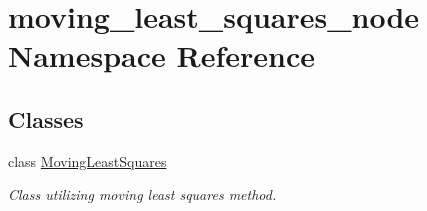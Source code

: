 \hypertarget{namespacemoving__least__squares__node}{}\section{moving\+\_\+least\+\_\+squares\+\_\+node Namespace Reference}
\label{namespacemoving__least__squares__node}
\subsection*{Classes}
\begin{DoxyCompactItemize}
\item 
class \hyperlink{classmoving__least__squares__node_1_1_moving_least_squares}{Moving\+Least\+Squares}
\begin{DoxyCompactList}\small\item\em Class utilizing moving least squares method. \end{DoxyCompactList}\end{DoxyCompactItemize}
